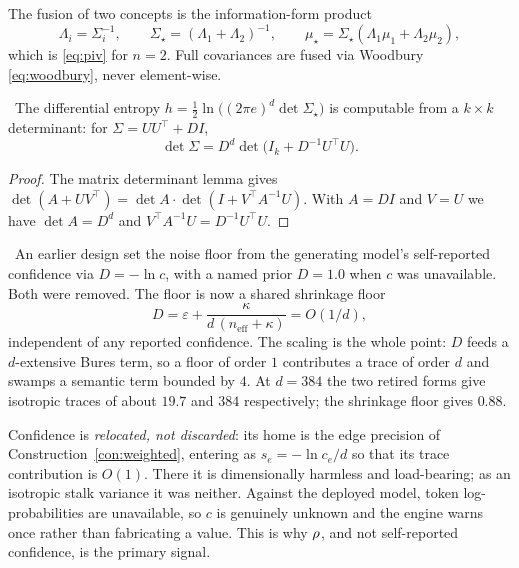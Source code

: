\begin{definition}\label{def:fusion}
The fusion of two concepts is the information-form product
\begin{equation}\label{eq:merge}
  \Lambda_i=\Sigma_i^{-1},\qquad
  \Sigma_\star=(\Lambda_1+\Lambda_2)^{-1},\qquad
  \mu_\star=\Sigma_\star(\Lambda_1\mu_1+\Lambda_2\mu_2),
\end{equation}
which is \eqref{eq:piv} for $n=2$. Full covariances are fused via
Woodbury \eqref{eq:woodbury}, never element-wise.
\end{definition}

\begin{proposition}\label{prop:entropy}
\Proved\ The differential entropy
$h=\tfrac12\ln\bigl((2\pi e)^d\det\Sigma_\star\bigr)$ is computable from
a $k\times k$ determinant: for $\Sigma=UU^\top+DI$,
\begin{equation}\label{eq:detlemma}
  \det\Sigma=D^d\det\bigl(I_k+D^{-1}U^\top U\bigr).
\end{equation}
\end{proposition}
\begin{proof}
The matrix determinant lemma gives
$\det(A+UV^\top)=\det A\cdot\det(I+V^\top A^{-1}U)$. With $A=DI$ and
$V=U$ we have $\det A=D^d$ and $V^\top A^{-1}U=D^{-1}U^\top U$.
\end{proof}

\begin{remark}\label{rem:stalkfloor}
\Implemented\ An earlier design set the noise floor from the generating
model's self-reported confidence via $D=-\ln c$, with a named prior
$D=1.0$ when $c$ was unavailable. Both were removed. The floor is now a
shared shrinkage floor
\[
  D=\varepsilon+\frac{\kappa}{d\,(n_{\mathrm{eff}}+\kappa)}=O(1/d),
\]
independent of any reported confidence. The scaling is the whole point:
$D$ feeds a $d$-extensive Bures term, so a floor of order $1$
contributes a trace of order $d$ and swamps a semantic term bounded by
$4$. At $d=384$ the two retired forms give isotropic traces of about
$19.7$ and $384$ respectively; the shrinkage floor gives $0.88$.

Confidence is \emph{relocated, not discarded}: its home is the edge
precision of Construction~\ref{con:weighted}, entering as
$s_e=-\ln c_e/d$ so that its trace contribution is $O(1)$. There it is
dimensionally harmless and load-bearing; as an isotropic stalk variance
it was neither. Against the deployed model, token log-probabilities are
unavailable, so $c$ is genuinely unknown and the engine warns once
rather than fabricating a value. This is why $\rho$, and not
self-reported confidence, is the primary signal.
\end{remark}

